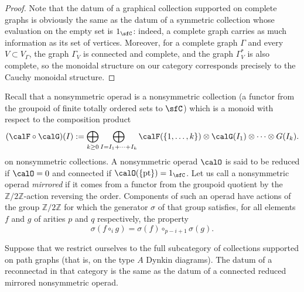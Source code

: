 \begin{proof}
Note that the datum of a graphical collection supported on complete graphs is obviously the same as the datum of a symmetric collection whose evaluation on the empty set is $1_{\sfC}$: indeed, a complete graph carries as much information as its set of vertices. Moreover, for a complete graph $\Gamma$ and every $V\subset V_\Gamma$, the graph $\Gamma_V$ is connected and complete, and the graph $\Gamma^*_V$ is also complete, so the monoidal structure on our category corresponds precisely to the Cauchy monoidal structure. 
\end{proof}

Recall that a nonsymmetric operad is a nonsymmetric collection (a functor from the groupoid of finite totally ordered sets to $\sfC$) which is a monoid with respect to the composition product 
 \[
(\calF\circ\calG)(I):=\bigoplus_{k\ge 0}\bigoplus_{I=I_1+\cdots+I_k}\calF(\{1,\ldots,k\})\otimes\calG(I_1)\otimes\cdots\otimes G(I_k). 
 \]
on nonsymmetric collections. A nonsymmetric operad $\calO$ is said to be reduced if $\calO=0$ and connected if $\calO(\{\mathrm{pt}\})=1_{\sfC}$. Let us call a nonsymmetric operad \emph{mirrored} if it comes from a functor from the groupoid quotient by the $\mathbb{Z}/2\mathbb{Z}$-action reversing the order. Components of such an operad have actions of the group $\mathbb{Z}/2\mathbb{Z}$ for which the generator $\sigma$ of that group satisfies, for all elements $f$ and $g$ of arities $p$ and $q$ respectively, the property
 \[
\sigma(f\circ_i g)=\sigma(f)\circ_{p-i+1}\sigma(g). 
 \]

\begin{prop}\label{prop:NS}
Suppose that we restrict ourselves to the full subcategory of collections supported on path graphs (that is, on the type $A$ Dynkin diagrams). The datum of a reconnectad in that category is the same as the datum of a connected reduced mirrored nonsymmetric operad.
\end{prop}

